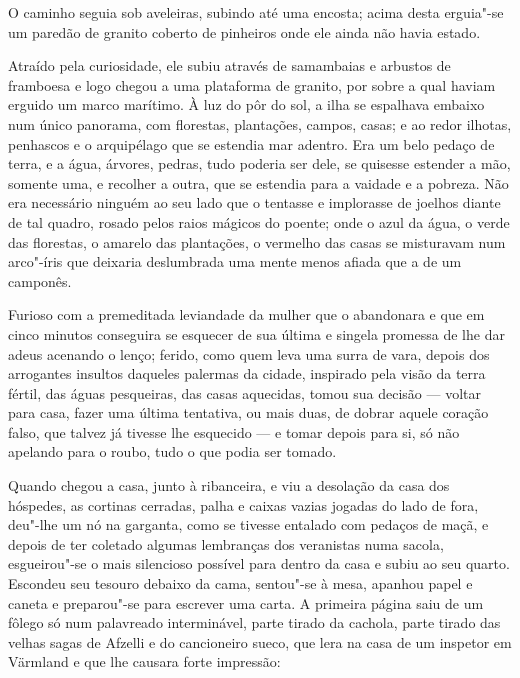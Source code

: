 O caminho seguia sob aveleiras, subindo até uma encosta; acima desta erguia"-se
um paredão de granito coberto de pinheiros onde ele ainda não havia estado.

Atraído pela curiosidade, ele subiu através de samambaias e arbustos de 
framboesa e logo chegou a uma plataforma de granito, por sobre a qual 
haviam erguido um marco marítimo. À luz do pôr do sol, a ilha se espalhava 
embaixo num único panorama, com florestas, plantações, campos, casas; 
e ao redor ilhotas, penhascos e o arquipélago que se estendia mar 
adentro. Era um belo pedaço de terra, e a água, árvores, 
pedras, tudo poderia ser dele, se quisesse estender a
mão, somente uma, e recolher a outra, que se estendia para a vaidade e a
pobreza. Não era necessário ninguém ao seu lado que o tentasse e implorasse de
joelhos diante de tal quadro, rosado pelos raios mágicos do poente; onde o azul
da água, o verde das florestas, o amarelo das plantações, o vermelho das casas
se misturavam num arco"-íris que deixaria deslumbrada uma mente menos afiada que a
de um camponês.

Furioso com a premeditada leviandade da mulher que o abandonara e que em
cinco minutos conseguira se esquecer de sua última e singela promessa de lhe dar
adeus acenando o lenço; ferido, como quem leva uma surra de vara, depois dos
arrogantes insultos daqueles palermas da cidade, inspirado pela visão da terra
fértil, das águas pesqueiras, das casas aquecidas, tomou sua decisão --- voltar
para casa, fazer uma última tentativa, ou mais duas, de dobrar aquele coração
falso, que talvez já tivesse lhe esquecido --- e tomar depois para si, só não
apelando para o roubo, tudo o que podia ser tomado.

\asterisc

Quando chegou a casa, junto à ribanceira, e viu a desolação da casa dos hóspedes,
as cortinas cerradas, palha e caixas vazias jogadas do lado de fora, deu"-lhe um
nó na garganta, como se tivesse entalado com pedaços de maçã, e depois de ter
coletado algumas lembranças dos veranistas numa sacola, esgueirou"-se o mais
silencioso possível para dentro da casa e subiu ao seu quarto. Escondeu seu 
tesouro debaixo da cama, sentou"-se à mesa, apanhou papel e caneta e
preparou"-se para escrever uma carta. A primeira página saiu de um fôlego só num
palavreado interminável, parte tirado da cachola, parte tirado das velhas
sagas de Afzelli e do cancioneiro sueco, que lera na casa de um inspetor em
Värmland e que lhe causara forte impressão:

